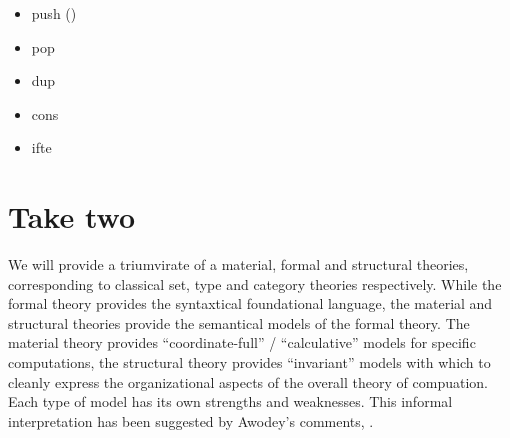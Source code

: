 \documentclass[a4paper,openany]{amsart}
\begin{document}
\begin{itemize}

	\item push () 

	\item pop  

	\item dup  

	\item cons 
	
	\item ifte 

\end{itemize}

\section{Take two}
	
We will provide a triumvirate of a material, formal and structural theories,
corresponding to classical set, type and category theories respectively. While
the formal theory provides the syntaxtical foundational language, the material
and structural theories provide the semantical models of the formal theory. The
material theory provides ``coordinate-full'' / ``calculative'' models for
specific computations, the structural theory provides ``invariant'' models with
which to cleanly express the organizational aspects of the overall theory of
compuation. Each type of model has its own strengths and weaknesses. This
informal interpretation has been suggested by Awodey's comments, \cite[Section 5
``Conclusions'']{awodey2009a}.

\printbibliography
\end{document}
